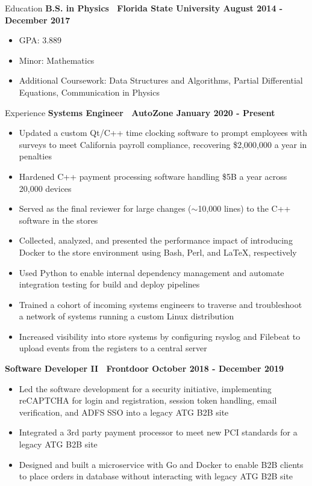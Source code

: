 \documentclass{resume} %
\begin{document}
\begin{rSection}{Education}
    {\bf B.S. in Physics \textbar\ Florida State University \hfill August 2014 - December 2017}
    \begin{itemize}
        \item GPA: 3.889
        \item Minor: Mathematics
        \item Additional Coursework: Data Structures and Algorithms, Partial Differential Equations, Communication in Physics
    \end{itemize}
\end{rSection}

\begin{rSection}{Experience}
    {\bf Systems Engineer \textbar\ AutoZone \hfill January 2020 - Present}
    \begin{itemize}
        \item Updated a custom Qt/C++ time clocking software to prompt employees with surveys to meet California payroll compliance, recovering \$2,000,000 a year in penalties
        \item Hardened C++ payment processing software handling \$5B a year across 20,000 devices
        \item Served as the final reviewer for large changes ($\sim$10,000 lines) to the C++ software in the stores
        \item Collected, analyzed, and presented the performance impact of introducing Docker to the store environment using Bash, Perl, and \LaTeX, respectively
        \item Used Python to enable internal dependency management and automate integration testing for build and deploy pipelines
        \item Trained a cohort of incoming systems engineers to traverse and troubleshoot a network of systems running a custom Linux distribution
        \item Increased visibility into store systems by configuring rsyslog and Filebeat to upload events from the registers to a central server
    \end{itemize}

    {\bf Software Developer II \textbar\ Frontdoor \hfill October 2018 - December 2019}
    \begin{itemize}
        \item Led the software development for a security initiative, implementing reCAPTCHA for login and registration, session token handling, email verification, and ADFS SSO into a legacy ATG B2B site
        \item Integrated a 3rd party payment processor to meet new PCI standards for a legacy ATG B2B site
        \item Designed and built a microservice with Go and Docker to enable B2B clients to place orders in database without interacting with legacy ATG B2B site
    \end{itemize}
    

\end{rSection}
\end{document}
